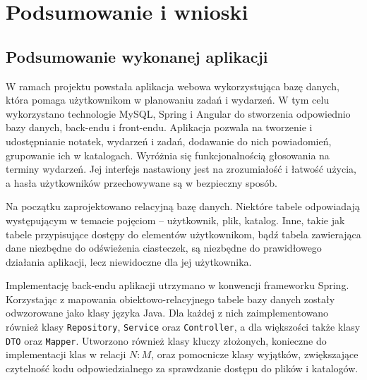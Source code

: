 \documentclass[a4paper,twoside,12pt]{book}
\begin{document}
\chapter{Podsumowanie i wnioski}

\section{Podsumowanie wykonanej aplikacji}

W ramach projektu powstała aplikacja webowa wykorzystująca bazę danych, która pomaga użytkownikom w planowaniu zadań i wydarzeń. W tym celu wykorzystano technologie MySQL, Spring i Angular do stworzenia odpowiednio bazy danych, back-endu i front-endu. Aplikacja pozwala na tworzenie i udostępnianie notatek, wydarzeń i zadań, dodawanie do nich powiadomień, grupowanie ich w katalogach. Wyróżnia się funkcjonalnością głosowania na terminy wydarzeń. Jej interfejs nastawiony jest na zrozumiałość i łatwość użycia, a hasła użytkowników przechowywane są w bezpieczny sposób. 

Na początku zaprojektowano relacyjną bazę danych. Niektóre tabele odpowiadają występującym w temacie pojęciom -- użytkownik, plik, katalog. Inne, takie jak tabele przypisujące dostępy do elementów użytkownikom, bądź tabela zawierająca dane niezbędne do odświeżenia ciasteczek, są niezbędne do prawidłowego działania aplikacji, lecz niewidoczne dla jej użytkownika.

Implementację back-endu aplikacji utrzymano w konwencji frameworku Spring. Korzystając z mapowania obiektowo-relacyjnego tabele bazy danych zostały odwzorowane jako klasy języka Java. Dla każdej z nich zaimplementowano również klasy \texttt{Repository}, \texttt{Service} oraz \texttt{Controller}, a dla większości także klasy \texttt{DTO} oraz \texttt{Mapper}. Utworzono również klasy kluczy złożonych, konieczne do implementacji klas w relacji $N:M$, oraz pomocnicze klasy wyjątków, zwiększające czytelność kodu odpowiedzialnego za sprawdzanie dostępu do plików i katalogów.
\end{document}
